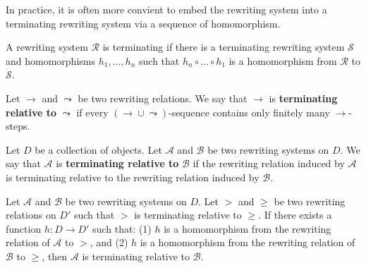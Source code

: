 \documentclass{book}
\begin{document}
    In practice, it is often more convient to embed the rewriting system into a terminating rewriting system via a sequence of homomorphism.
    \begin{corollary}
      A rewriting system $\mathcal{R}$ is terminating if there is a terminating rewriting system $\mathcal{S}$ and homomorphisms $h_1,\ldots, h_n$ such that $h_n \circ \ldots \circ h_1$ is a homomorphism from $\mathcal{R}$ to $\mathcal{S}$.
    \end{corollary}
    
    \begin{definition}
        \label{def:rewriting_relation:relative_termination}
        Let \( \mathop{\to} \) and \( \leadsto \) be two rewriting relations. We say that \(\to\) is \textbf{terminating relative to} \(\leadsto\) if every \( \left( \mathop{\to} \mathop{\cup} \leadsto \right) \)-sequence contains only finitely many \(\to\)-steps.
    \end{definition}
    
    \begin{definition}
        \label{def:rewriting_system:relative_termination}
        Let $D$ be a collection of objects.
        Let \( \mathcal{A} \) and \( \mathcal{B} \) be two rewriting systems on $D$. We say that \(\mathcal{A}\) is \textbf{terminating relative to} \(\mathcal{B}\) if the rewriting relation induced by \(\mathcal{A}\) is terminating relative to the rewriting relation induced by \(\mathcal{B}\).
    \end{definition}
    
    \begin{definition}
        \label{def:rewriting_system:proving_relative_termination}
        Let \( \mathcal{A} \) and \( \mathcal{B} \) be two rewriting systems on $D$. Let $>$ and $\geq$ be two rewriting relations on $D'$ such that $>$ is terminating relative to $\geq$. If there exists a function $h : D \mathop{\to} D'$ such that: (1) $h$ is a homomorphism from the rewriting relation of \(\mathcal{A}\) to $>$, and (2) $h$ is a homomorphism from the rewriting relation of \(\mathcal{B}\) to $\geq$, then \(\mathcal{A}\) is terminating relative to \(\mathcal{B}\).
    \end{definition}
    
\end{document}
